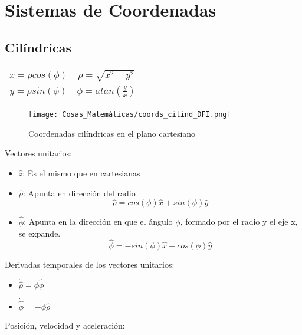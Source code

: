 \newpage
\section{Sistemas de Coordenadas}

\subsection{Cilíndricas}

\begin{table}[H]
    \centering
    \begin{tabular}{|c|c|}
        \hline
        $x = {\rho}cos(\phi)$ & $\rho = \sqrt{x^2 + y^2}$ \\
        \hline
        $y = {\rho}sin(\phi)$ & $\phi = atan(\frac{y}{x})$ \\
        \hline
    \end{tabular}
\end{table}

\begin{figure}[H]
    \centering
    \texttt{[image: Cosas\_Matemáticas/coords\_cilind\_DFI.png]}
    \caption{Coordenadas cilíndricas en el plano cartesiano}
    \label{fig:C.cilindricas}
\end{figure}

Vectores unitarios:

\begin{itemize}
    \item $\hat{z}$: Es el mismo que en cartesianas
    \item $\hat{\rho}$: Apunta en dirección del radio
        \[\hat{\rho} = cos(\phi)\hat{x} + sin(\phi)\hat{y}\]
    \item $\hat{\phi}$: Apunta en la dirección en que el ángulo $\phi$, formado por el radio y el eje x, se expande. %
        \[\hat{\phi} = -sin(\phi)\hat{x} + cos(\phi)\hat{y}\]
\end{itemize}

\medbreak

Derivadas temporales de los vectores unitarios:

\begin{itemize}
    \item $\dot{\hat{\rho}} = \dot{\phi}\hat{\phi}$
    \item $\dot{\hat{\phi}} = -\dot{\phi}\hat{\rho}$
\end{itemize}

\medbreak

Posición, velocidad y aceleración:

